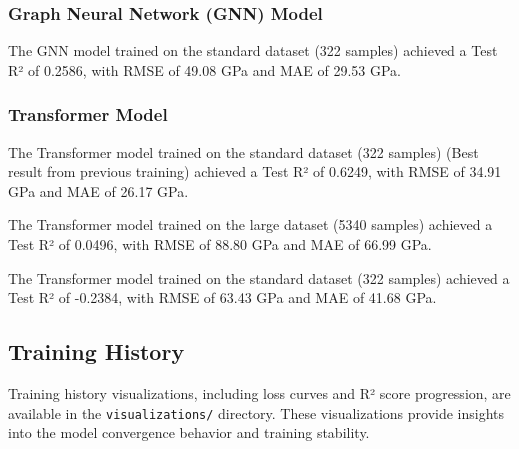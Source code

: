 \subsubsection{Graph Neural Network (GNN) Model}

The GNN model trained on the standard dataset (322 samples) achieved a Test R² of 0.2586, with RMSE of 49.08 GPa and MAE of 29.53 GPa.

\subsubsection{Transformer Model}

The Transformer model trained on the standard dataset (322 samples) (Best result from previous training) achieved a Test R² of 0.6249, with RMSE of 34.91 GPa and MAE of 26.17 GPa.

The Transformer model trained on the large dataset (5340 samples) achieved a Test R² of 0.0496, with RMSE of 88.80 GPa and MAE of 66.99 GPa.

The Transformer model trained on the standard dataset (322 samples) achieved a Test R² of -0.2384, with RMSE of 63.43 GPa and MAE of 41.68 GPa.

\subsection{Training History}

Training history visualizations, including loss curves and R² score progression, are available in the \texttt{visualizations/} directory. These visualizations provide insights into the model convergence behavior and training stability.
